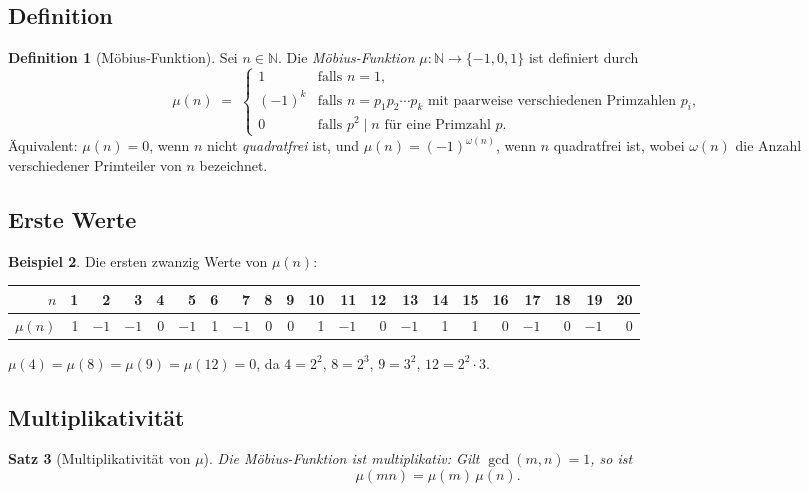 \documentclass[12pt,a4paper]{amsart}
\newtheorem{theorem}{Satz}[section]
\theoremstyle{definition}
\newtheorem{definition}[theorem]{Definition}
\newtheorem{beispiel}[theorem]{Beispiel}
\newcommand{\N}{\mathbb{N}}
\begin{document}
\subsection{Definition}

\begin{definition}[Möbius-Funktion]
\label{def:mobius}
Sei $n \in \N$.  Die \emph{Möbius-Funktion} $\mu : \N \to \{-1,0,1\}$ ist
definiert durch
\[
  \mu(n) \;=\;
  \begin{cases}
    1                & \text{falls } n = 1, \\
    (-1)^{k}         & \text{falls } n = p_1 p_2 \cdots p_k
                       \text{ mit paarweise verschiedenen Primzahlen } p_i, \\
    0                & \text{falls } p^2 \mid n \text{ für eine Primzahl } p.
  \end{cases}
\]
Äquivalent: $\mu(n) = 0$, wenn $n$ nicht \emph{quadratfrei} ist, und
$\mu(n) = (-1)^{\omega(n)}$, wenn $n$ quadratfrei ist, wobei $\omega(n)$ die
Anzahl verschiedener Primteiler von $n$ bezeichnet.
\end{definition}

\subsection{Erste Werte}

\begin{beispiel}
\label{bsp:mobius-werte}
Die ersten zwanzig Werte von $\mu(n)$:
\begin{center}
\begin{tabular}{r|rrrrrrrrrrrrrrrrrrrr}
$n$      & 1 & 2 & 3 & 4 & 5 & 6 & 7 & 8 & 9 & 10
         & 11 & 12 & 13 & 14 & 15 & 16 & 17 & 18 & 19 & 20 \\
\hline
$\mu(n)$ & 1 & $-1$ & $-1$ & 0 & $-1$ & 1 & $-1$ & 0 & 0 & 1
         & $-1$ & 0 & $-1$ & 1 & 1 & 0 & $-1$ & 0 & $-1$ & 0
\end{tabular}
\end{center}
$\mu(4) = \mu(8) = \mu(9) = \mu(12) = 0$, da $4=2^2$, $8=2^3$,
$9=3^2$, $12=2^2 \cdot 3$.
\end{beispiel}

\subsection{Multiplikativität}

\begin{theorem}[Multiplikativität von $\mu$]
\label{satz:mobius-mult}
Die Möbius-Funktion ist \emph{multiplikativ}: Gilt $\gcd(m,n)=1$, so ist
\[
  \mu(mn) = \mu(m)\,\mu(n).
\]
\end{theorem}
\end{document}
